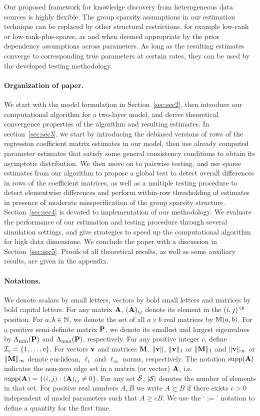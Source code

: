 Our proposed framework for knowledge discovery from heterogeneous data sources is highly flexible. The group sparsity assumptions in our estimation technique can be replaced by other structural restrictions, for example low-rank or low-rank-plus-sparse, as and when deemed appropriate by the prior dependency assumptions across parameters. As long as the resulting estimates converge to corresponding true parameters at certain rates, they can be used by the developed testing methodology.

\paragraph{Organization of paper.}
We start with the model formulation in Section~\ref{sec:sec2}, then introduce our computational algorithm for a two-layer model, and derive theoretical convergence properties of the algorithm and resulting estimates. In section~\ref{sec:sec3}, we start by introducing the debiased versions of rows of the regression coefficient matrix estimates in our model, then use already computed parameter estimates that satisfy some general consistency conditions to obtain its asymptotic distribution. We then move on to pairwise testing, and use sparse estimates from our algorithm to propose a global test to detect overall differences in rows of the coefficient matrices, as well as a multiple testing procedure to detect elementwise differences and perform within-row thresholding of estimates in presence of moderate misspecification of the group sparsity structure. Section~\ref{sec:sec4} is devoted to implementation of our methodology. We evaluate the performance of our estimation and testing procedure through several simulation settings, and give strategies to speed up the computational algorithm for high data dimensions.  We conclude the paper with a discussion in Section~\ref{sec:sec5}. Proofs of all theoretical results, as well as some auxiliary results, are given in the appendix.

\paragraph{Notations.}
We denote scalars by small letters, vectors by bold small letters and matrices by bold capital letters. For any matrix ${\mathbf{A}}$, $({\mathbf{A}})_{ij}$ denote its element in the $(i,j)\operatorname*{^{\text{th}}}$ position. For $a,b \in {\mathbb{N}}$, we denote the set of all $a \times b$ real matrices by ${\mathbb{M}}(a,b)$. For a positive semi-definite matrix ${\mathbf{P}}$, we denote its smallest and largest eigenvalues by $\Lambda_{\min} ({\mathbf{P}})$ and $\Lambda_{\max} ({\mathbf{P}})$, respectively. For any positive integer $c$, define ${\cal{I}}_c = \{ 1, \ldots, c\}$. For vectors ${\bf{v}}$ and matrices ${\mathbf{M}}$, $\| {\bf{v}} \|$, $\|{\bf{v}} \|_1$ or $\|{\mathbf{M}} \|_1$ and $\|{\bf{v}} \|_\infty$ or $\|{\mathbf{M}} \|_\infty$ denote euclidean, $\ell_1$ and $\ell_\infty$ norms, respectively. The notation $\operatorname*{supp}({\mathbf{A}})$ indicates the non-zero edge set in a matrix (or vector) ${\mathbf{A}}$, i.e. $\operatorname*{supp}({\mathbf{A}}) = \{(i,j): ({\mathbf{A}})_{ij} \neq 0\}$. For any set ${\cal{S}}$, $| {\cal{S}}|$ denotes the number of elements in that set. For positive real numbers $A, B$ we write $A \succsim B$ if there exists $c>0$ independent of model parameters such that $A \geq cB$. We use the `$:=$' notation to define a quantity for the first time.